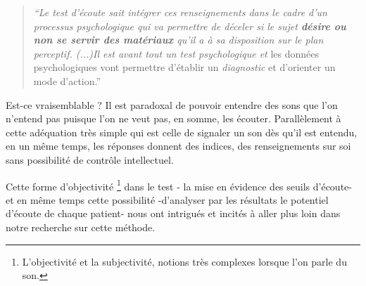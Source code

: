 \begin{quote}
\emph{``Le test d'écoute sait intégrer ces renseignements dans le
cadre d'un processus psychologique qui va permettre de déceler si
le sujet\textbf{ désire ou non se servir des matériaux }qu'il a à sa disposition
sur le plan perceptif. (...)Il est avant tout un test psychologique
et} les données psychologiques vont permettre d'établir un\emph{ diagnostic}
et d'orienter un mode d'action.''
\end{quote}

Est-ce vraisemblable ?
Il est paradoxal de pouvoir  entendre des sons que l'on
n'entend pas puisque l'on ne veut pas, en somme, les écouter. Parallèlement à cette
adéquation très simple qui est celle de signaler un son dès qu'il est 
entendu, en un même temps, les
réponses donnent des indices, des renseignements sur soi sans possibilité de 
contrôle intellectuel.


Cette forme d'objectivité \footnote{L'objectivité et la
  subjectivité, notions très complexes lorsque l'on parle du
  son.} dans le test - la mise en évidence des seuils d'écoute- et en
même temps cette possibilité -d'analyser par les résultats le potentiel d'écoute de
chaque patient- nous ont intrigués et incités à aller plus loin dans notre recherche sur cette méthode.
 





